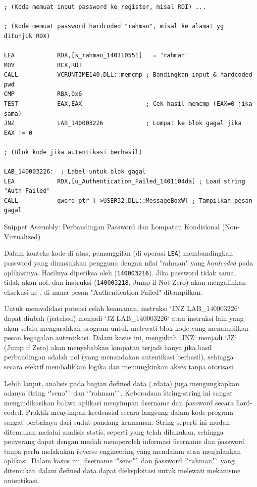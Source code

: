 \begin{listing}[H]
    \begin{verbatim}
; (Kode memuat input password ke register, misal RDI) ...

; (Kode memuat password hardcoded "rahman", misal ke alamat yg ditunjuk RDX)

LEA            RDX,[s_rahman_140110551]   = "rahman"
MOV            RCX,RDI
CALL           VCRUNTIME140.DLL::memcmp ; Bandingkan input & hardcoded pwd
CMP            RBX,0x6
TEST           EAX,EAX                  ; Cek hasil memcmp (EAX=0 jika sama)
JNZ            LAB_140003226            ; Lompat ke blok gagal jika EAX != 0

; (Blok kode jika autentikasi berhasil) 

LAB_140003226:  ; Label untuk blok gagal
LEA            RDX,[u_Authentication_Failed_1401104da] ; Load string "Auth Failed"
CALL           qword ptr [->USER32.DLL::MessageBoxW] ; Tampilkan pesan gagal

\end{verbatim}
\caption{Snippet Assembly: Perbandingan Password dan Lompatan Kondisional (Non-Virtualized)}
\label{lst:asm_static_nonvirt_snippet}
\end{listing}

Dalam konteks kode di atas, pemanggilan  (di operasi \texttt{LEA}) membandingkan password yang dimasukkan pengguna dengan nilai "rahman" yang \textit{hardcoded} pada aplikasinya. Hasilnya diperiksa oleh  (\texttt{140003216}). Jika password tidak sama,  tidak akan nol, dan instruksi  (\texttt{140003218}, Jump if Not Zero) akan mengalihkan eksekusi ke , di mana pesan "Authentication Failed" ditampilkan. 

Untuk memvalidasi potensi celah keamanan, instruksi `JNZ LAB\_140003226` dapat diubah (\f{patched}) menjadi `JZ LAB\_140003226` atau instruksi lain yang akan selalu mengarahkan program untuk melewati blok kode yang menampilkan pesan kegagalan autentikasi. Dalam kasus ini, mengubah `JNZ` menjadi `JZ` (Jump if Zero) akan menyebabkan lompatan terjadi hanya jika hasil perbandingan adalah nol (yang menandakan autentikasi berhasil), sehingga secara efektif membalikkan logika dan memungkinkan akses tanpa otorisasi.

Lebih lanjut, analisis pada bagian \f{defined data} (.rdata) juga mengungkapkan adanya \f{string} `"seno"` dan `"rahman"`. Keberadaan \f{string-string} ini sangat mengindikasikan bahwa aplikasi menyimpan \f{username} dan \f{password} secara \f{hard-coded}. Praktik menyimpan kredensial secara langsung dalam kode program sangat berbahaya dari sudut pandang keamanan. String seperti ini mudah ditemukan melalui analisis statis, seperti yang telah dilakukan, sehingga penyerang dapat dengan mudah memperoleh informasi \f{username} dan \f{password} tanpa perlu melakukan \f{reverse engineering} yang mendalam atau menjalankan aplikasi. Dalam kasus ini, \f{username} `"seno"` dan \f{password} `"rahman"` yang ditemukan dalam \f{defined data} dapat dieksploitasi untuk melewati mekanisme autentikasi.

